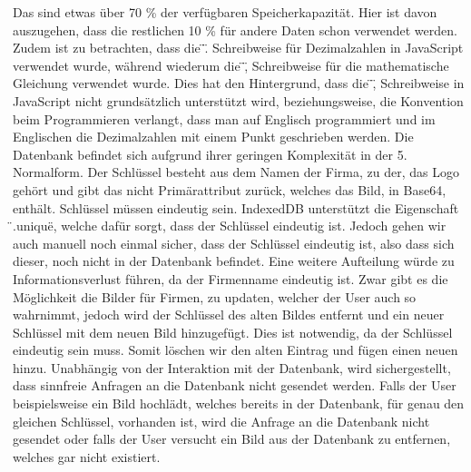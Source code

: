 \newline
\newline
Das sind etwas über 70 \%\) der verfügbaren Speicherkapazität.
Hier ist davon auszugehen, dass die restlichen 10 \%\) für andere Daten schon verwendet werden.
Zudem ist zu betrachten, dass die \"\).\"\) Schreibweise für Dezimalzahlen in JavaScript verwendet wurde, während wiederum die \"\),\"\) Schreibweise für die mathematische Gleichung verwendet wurde.
Dies hat den Hintergrund, dass die \"\),\"\) Schreibweise in JavaScript nicht grundsätzlich unterstützt wird, beziehungsweise, die Konvention beim Programmieren verlangt, dass man auf Englisch programmiert und im Englischen die Dezimalzahlen mit einem Punkt geschrieben werden.
\newline
\newline
Die Datenbank befindet sich aufgrund ihrer geringen Komplexität in der 5. Normalform.
Der Schlüssel besteht aus dem Namen der Firma, zu der, das Logo gehört und gibt das nicht Primärattribut zurück, welches das Bild, in Base64, enthält.
Schlüssel müssen eindeutig sein.
IndexedDB unterstützt die Eigenschaft \"\).unique\"\), welche dafür sorgt, dass der Schlüssel eindeutig ist.
Jedoch gehen wir auch manuell noch einmal sicher, dass der Schlüssel eindeutig ist, also dass sich dieser, noch nicht in der Datenbank befindet.
Eine weitere Aufteilung würde zu Informationsverlust führen, da der Firmenname eindeutig ist.
\newline
\newline
Zwar gibt es die Möglichkeit die Bilder für Firmen, zu updaten, welcher der User auch so wahrnimmt, jedoch wird der Schlüssel des alten Bildes entfernt und ein neuer Schlüssel mit dem neuen Bild hinzugefügt.
Dies ist notwendig, da der Schlüssel eindeutig sein muss.
Somit löschen wir den alten Eintrag und fügen einen neuen hinzu.
Unabhängig von der Interaktion mit der Datenbank, wird sichergestellt, dass sinnfreie Anfragen an die Datenbank nicht gesendet werden.
Falls der User beispielsweise ein Bild hochlädt, welches bereits in der Datenbank, für genau den gleichen Schlüssel, vorhanden ist, wird die Anfrage an die Datenbank nicht gesendet oder falls der User versucht ein Bild aus der Datenbank zu entfernen, welches gar nicht existiert.
\newline
\newline
